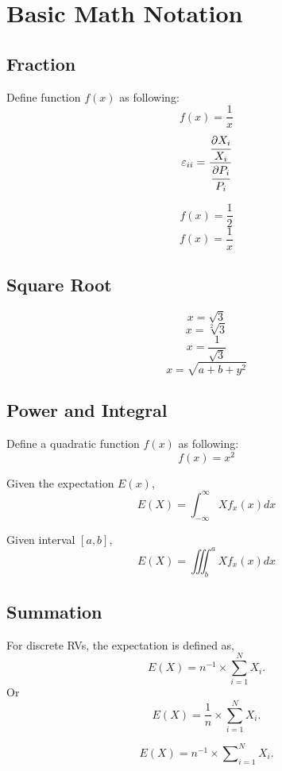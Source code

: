 \documentclass[11pt]{article}
\newcommand{\infinity}{\infty}
\begin{document}
    
    \section{Basic Math Notation}
        \subsection{Fraction}
        Define function $f(x)$ as following:
        $$ f(x) = \frac{1}{x} $$
        $$ \varepsilon_{ii} = \cfrac{\cfrac{\partial X_i}{X_i}} {\cfrac{\partial P_i}{P_i}} $$

        $$ f(x) = \frac12$$
        $$ f(x) = \frac1x$$


        \subsection{Square Root}
        $$ x = \sqrt3 $$
        $$ x = \sqrt[2]{3} $$
        $$ x = \frac{1}{\sqrt{3}} $$
        $$ x = \sqrt{a+b+y^2} $$


        \subsection{Power and Integral}
        Define a quadratic function $f(x)$ as following:
        $$ f(x) = x^2 $$

        Given the expectation $E(x)$,
        $$ E(X) = \int^\infinity_{-\infinity} X f_{x}(x)dx$$

        Given interval $[a, b]$, 
        $$ E(X) = \iiint ^a _b X f_x(x)dx $$

        \subsection{Summation}
        For discrete RVs, the expectation is defined as,
        $$ E(X) = n ^{-1} \times \sum_{i = 1} ^N {X_i}. $$
        Or
        $$ E(X) = \frac{1}{n} \times \sum _{i = 1} ^N {X_i}. $$

        $$ E(X) = n^{-1} \times \sum\nolimits_{i = 1} ^N {X_i}. $$
\end{document}
